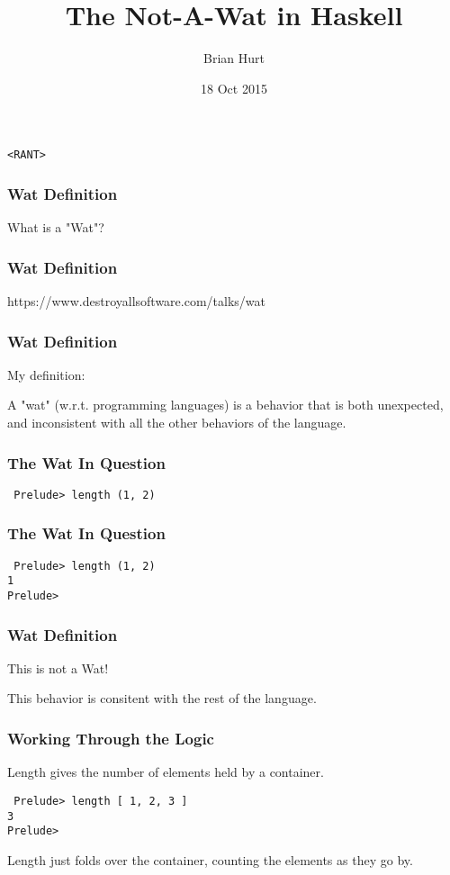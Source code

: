 \documentclass{beamer}
\title{The Not-A-Wat in Haskell}
\author{Brian Hurt}
\date{18 Oct 2015}
\begin{document}
\begin{frame}
    \titlepage
\end{frame}

\begin{frame}
\begin{center}{\tt \Huge <RANT>}\end{center}
\end{frame}

\begin{frame}
\frametitle{Wat Definition}
\begin{center}\Large{What is a "Wat"?}\end{center}
\end{frame}

\begin{frame}
\frametitle{Wat Definition}
\begin{center}\Large{https://www.destroyallsoftware.com/talks/wat}\end{center}
\end{frame}

\begin{frame}
\frametitle{Wat Definition}
\begin{center}
My definition:

A "wat" (w.r.t. programming languages) is a behavior that is both
unexpected, and inconsistent with all the other behaviors of the
language.
\end{center}
\end{frame}

\begin{frame}[fragile]
\frametitle{The Wat In Question}
{\tt \Large{
Prelude> length (1, 2)\\
}}
\end{frame}

\begin{frame}[fragile]
\frametitle{The Wat In Question}
{\tt \Large{
Prelude> length (1, 2)\\
1\\
Prelude> 
}}
\end{frame}

\begin{frame}
\frametitle{Wat Definition}
\begin{center}
{\Huge This is not a Wat!}

This behavior is consitent with the rest of the language.
\end{center}
\end{frame}

\begin{frame}[fragile]
\frametitle{Working Through the Logic}
{\Large
Length gives the number of elements held by a container.

\vspace{20pt}

{\tt
Prelude> length [ 1, 2, 3 ]\\
3\\
Prelude> 
}

\vspace{20pt}

Length just folds over the container, counting the elements as they go by.
}
\end{frame}
\end{document}
